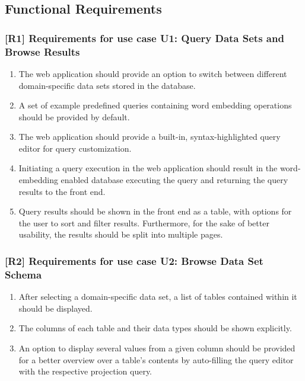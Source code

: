 \subsection{Functional Requirements}
\subsubsection{[R1] Requirements for use case U1: Query Data Sets and Browse Results}
\begin{enumerate}[label=R1.\arabic*]
	\item The web application should provide an option to switch between different domain-specific data sets stored in the database.
	\item A set of example predefined queries containing word embedding operations should be provided by default.
	\item The web application should provide a built-in, syntax-highlighted query editor for query customization.
	\item Initiating a query execution in the web application should result in the word-embedding enabled database executing the query and returning the query results to the front end.
	\item Query results should be shown in the front end as a table, with options for the user to sort and filter results. Furthermore, for the sake of better usability, the results should be split into multiple pages.
\end{enumerate}

\subsubsection{[R2] Requirements for use case U2: Browse Data Set Schema}
\begin{enumerate}[label=R2.\arabic*]
	\item After selecting a domain-specific data set, a list of tables contained within it should be displayed.
	\item The columns of each table and their data types should be shown explicitly.
	\item An option to display several values from a given column should be provided for a better overview over a table's contents by auto-filling the query editor with the respective projection query.
\end{enumerate}

